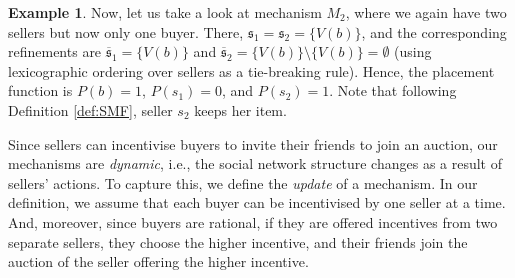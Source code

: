\documentclass[letterpaper]{article} %
\theoremstyle{definition}
\newtheorem{example}{Example}
\newcommand{\laurent}[1]{{[\color{purple}#1]}}
\begin{document}
\begin{example}
Now, let us take a look at mechanism $M_2$, where we again have two sellers but now only one buyer. There, $\mathfrak{s}_1 = \mathfrak{s}_2 = \{V(b)\}$, and the corresponding refinements are $\overline{\mathfrak{s}}_1 = \{V(b)\}$ and $\overline{\mathfrak{s}}_2 = \{V(b)\} \setminus \{V(b)\} = \emptyset$ (using lexicographic ordering over sellers as a tie-breaking rule). Hence, the placement function is $P(b) = 1$,  $P(s_1) = 0$, and $P(s_2) = 1$. Note that following Definition \ref{def:SMF},  seller $s_2$ keeps her item. 
\end{example}

Since sellers can incentivise buyers to invite their friends to join an auction, our mechanisms are \textit{dynamic}, i.e., the social network structure changes as a result of sellers' actions. To capture this, we define the \textit{update} of a mechanism.  In our definition, we assume that each buyer can be incentivised by one seller at a time. And, moreover, since buyers are rational, if they are offered incentives from two separate sellers, they choose the higher incentive, and their friends join the auction of the seller offering the higher incentive. 
\end{document}
